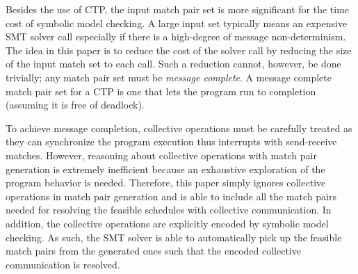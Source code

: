 

Besides the use of CTP, the input match pair set is more significant for the time cost of symbolic model checking. 
A large input set typically means an expensive SMT solver call especially if there is a high-degree of message non-determinism. 
The idea in this paper is to reduce the cost of the solver call by reducing the size of the input match set to each call. 
Such a reduction cannot, however, be done trivially; any match pair set must be \textit{message complete}.  
A message complete match pair set for a CTP is one that lets the program run to completion (assuming it is free of deadlock). 

To achieve message completion, collective operations must be carefully treated as they can synchronize the program execution thus interrupts with send-receive matches. 
However, reasoning about collective operations with match pair generation is extremely inefficient because an exhaustive exploration of the program behavior is needed. 
Therefore, this paper simply ignores collective operations in match pair generation and is able to include all the match pairs needed for resolving the feasible schedules with collective communication. 
In addition, the collective operations are explicitly encoded by symbolic model checking. As such, the SMT solver is able to automatically pick up the feasible match pairs from the generated ones such that the encoded collective communication is resolved.

